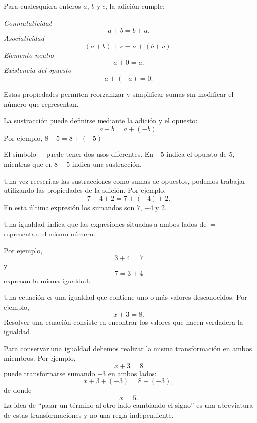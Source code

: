 \begin{tcolorbox}[resumen,title=Propiedades de la adición]
Para cualesquiera enteros \(a\), \(b\) y \(c\), la adición cumple:
  
\textit{Conmutatividad}
\[
a+b=b+a.
\]
\textit{Asociatividad}
\[
(a+b)+c=a+(b+c).
\]
\textit{Elemento neutro}
\[
a+0=a.
\]
\textit{Existencia del opuesto}
\[
a+(-a)=0.
\]

Estas propiedades permiten reorganizar y simplificar sumas sin modificar el número que representan.
\end{tcolorbox}

\begin{tcolorbox}[resumen,title=Sustracción]
La sustracción puede definirse mediante la adición y el opuesto:
\[
a-b=a+(-b).
\]
Por ejemplo,
\(
8-5=8+(-5).
\)

El símbolo \(-\) puede tener dos usos diferentes. En \(-5\) indica el opuesto de \(5\), mientras que en \(8-5\) indica una sustracción.

Una vez reescritas las sustracciones como sumas de opuestos, podemos trabajar utilizando las propiedades de la adición. Por ejemplo,
\[
7-4+2
=
7+(-4)+2.
\]
En esta última expresión los sumandos son \(7\), \(-4\) y \(2\).
\end{tcolorbox}

\begin{tcolorbox}[resumen,title=Igualdades y ecuaciones]
Una igualdad indica que las expresiones situadas a ambos lados de \(=\) representan el mismo número.

Por ejemplo,
\[
3+4=7
\]
y
\[
7=3+4
\]
expresan la misma igualdad.

Una ecuación es una igualdad que contiene uno o más valores desconocidos. Por ejemplo,
\[
x+3=8.
\]
Resolver una ecuación consiste en encontrar los valores que hacen verdadera la igualdad.

Para conservar una igualdad debemos realizar la misma transformación en ambos miembros. Por ejemplo,
\[
x+3=8
\]
puede transformarse sumando \(-3\) en ambos lados:
\[
x+3+(-3)=8+(-3),
\]
de donde
\[
x=5.
\]
La idea de ``pasar un término al otro lado cambiando el signo'' es una abreviatura de estas transformaciones y no una regla independiente.
\end{tcolorbox}
